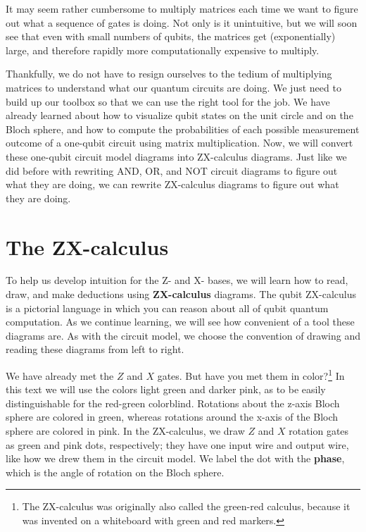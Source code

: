 \documentclass{article}
\theoremstyle{definition}
\begin{document}
It may seem rather cumbersome to multiply matrices each time we want to figure out what a sequence of gates is doing.  Not only is it unintuitive, but we will soon see that even with small numbers of qubits, the matrices get (exponentially) large, and therefore rapidly more computationally expensive to multiply.

Thankfully, we do not have to resign ourselves to the tedium of multiplying matrices to understand what our quantum circuits are doing.  We just need to build up our toolbox so that we can use the right tool for the job.  We have already learned about how to visualize qubit states on the unit circle and on the Bloch sphere, and how to compute the probabilities of each possible measurement outcome of a one-qubit circuit using matrix multiplication.  Now, we will convert these one-qubit circuit model diagrams into ZX-calculus diagrams.  Just like we did before with rewriting AND, OR, and NOT circuit diagrams to figure out what they are doing, we can rewrite ZX-calculus diagrams to figure out what they are doing.

\section{The ZX-calculus}
To help us develop intuition for the Z- and X- bases, we will learn how to read, draw, and make deductions using \textbf{ZX-calculus} diagrams.  The qubit ZX-calculus is a pictorial language in which you can reason about all of qubit quantum computation.  As we continue learning, we will see how convenient of a tool these diagrams are.  As with the circuit model, we choose the convention of drawing and reading these diagrams from left to right.

We have already met the $Z$ and $X$ gates.  But have you met them in color?\footnote{The ZX-calculus was originally also called the green-red calculus, because it was invented on a whiteboard with green and red markers.}  In this text we will use the colors light green and darker pink, as to be easily distinguishable for the red-green colorblind.  Rotations about the z-axis Bloch sphere are colored in green, whereas rotations around the x-axis of the Bloch sphere are colored in pink.  In the ZX-calculus, we draw $Z$ and $X$ rotation gates as green and pink dots, respectively; they have one input wire and output wire, like how we drew them in the circuit model.  We label the dot with the \textbf{phase}, which is the angle of rotation on the Bloch sphere.
\end{document}
